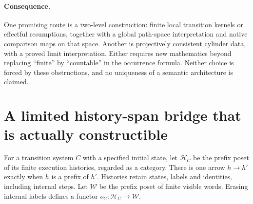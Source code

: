 \documentclass[11pt]{article}
\begin{document}
\paragraph{Consequence.} One promising route is a two-level construction: finite local transition kernels or effectful resumptions, together with a global path-space interpretation and native comparison maps on that space. Another is projectively consistent cylinder data, with a proved limit interpretation. Either requires new mathematics beyond replacing ``finite'' by ``countable'' in the occurrence formula. Neither choice is forced by these obstructions, and no uniqueness of a semantic architecture is claimed.

\section{A limited history-span bridge that is actually constructible}
For a transition system $C$ with a specified initial state, let $\mathcal H_C$ be the prefix poset of its finite execution histories, regarded as a category. There is one arrow $h\to h'$ exactly when $h$ is a prefix of $h'$. Histories retain states, labels and identities, including internal steps. Let $\mathcal W$ be the prefix poset of finite visible words. Erasing internal labels defines a functor $o_C:\mathcal H_C\to\mathcal W$.
\end{document}
